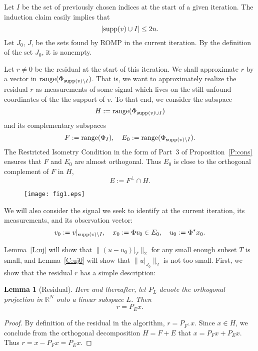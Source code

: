 \documentclass[12pt]{amsart}
\theoremstyle{plain}
\newtheorem{lemma}[theorem]{Lemma}
\theoremstyle{definition}
\theoremstyle{remark}
\numberwithin{equation}{section}
\begin{document}
Let $I$ be the set of previously chosen indices at the start of a given iteration.
The induction claim easily implies that 
\begin{equation}					\label{suppv I}
  |{{\rm supp}}(v) \cup I| \le 2n.    
\end{equation}
Let $J_0$, $J$, be the sets found by ROMP in the current iteration. 
By the definition of the set $J_0$, it is nonempty.

Let $r \ne 0$ be the residual at the start of this iteration. 
We shall approximate $r$ by a vector in $\operatorname*{range}(\Phi_{{{\rm supp}}(v) \setminus I})$.
That is, we want to approximately realize the residual $r$  
as measurements of some signal which lives on the still unfound
coordinates of the the support of $v$. 
To that end, we consider the subspace
$$
H := \operatorname*{range} (\Phi_{{{\rm supp}}(v) \cup I})
$$
and its complementary subspaces
$$
F := \operatorname*{range} (\Phi_I), \quad 
E_0 := \operatorname*{range} (\Phi_{{{\rm supp}}(v) \setminus I}).
$$
The Restricted Isometry Condition in the form of Part~3 of Proposition~\ref{P:cons} 
ensures that $F$ and $E_0$ are almost orthogonal. Thus $E_0$ is close to 
the orthogonal complement of $F$ in $H$,
$$
E := F^{\perp}\cap H.
$$
\begin{figure}[ht] \label{fig:cap}
  \texttt{[image: fig1.eps]}
\end{figure}

We will also consider the signal we seek to identify at the current iteration, 
its measurements, and its observation vector:
\begin{equation}            \label{v0 x0}
  v_0 := v|_{{{\rm supp}}(v) \setminus I}, \quad 
  x_0 := \Phi v_0 \in E_0, \quad u_0 := \Phi^*x_0.
\end{equation}

Lemma~\ref{L:uj} will show that $\|(u-u_0)|_T\|_2$ for any small enough subset $T$ is small, and Lemma~\ref{C:uj0} will show that $\|u|_{J_0}\|_2$ is not too small. First, we show that the residual $r$ has a simple description:

\begin{lemma}[Residual]     \label{residual}
  Here and thereafter, let $P_L$ denote the orthogonal projection in ${\mathbb{R}}^N$ 
  onto a linear subspace $L$. Then
  $$
  r = P_E x.
  $$
\end{lemma}

\begin{proof}
By definition of the residual in the algorithm,
$r = P_{F^\perp} x$. Since $x \in H$, we conclude from the orthogonal 
decomposition $H = F + E$ that $x = P_F x + P_E x$. Thus
$r = x - P_F x = P_E x$.
\end{proof}
\end{document}
